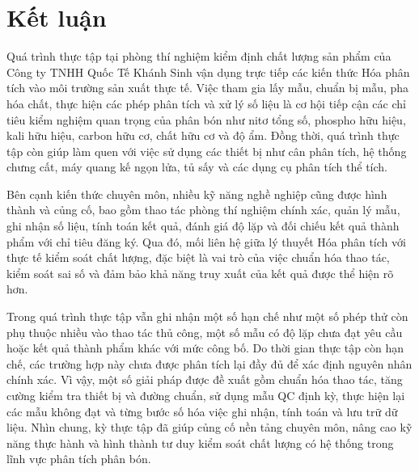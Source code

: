 \chapter{Kết luận}

Quá trình thực tập tại phòng thí nghiệm kiểm định chất lượng sản phẩm của Công ty TNHH Quốc Tế Khánh Sinh vận dụng trực tiếp các kiến thức Hóa phân tích vào môi trường sản xuất thực tế. Việc tham gia lấy mẫu, chuẩn bị mẫu, pha hóa chất, thực hiện các phép phân tích và xử lý số liệu là cơ hội tiếp cận các chỉ tiêu kiểm nghiệm quan trọng của phân bón như nitơ tổng số, phospho hữu hiệu, kali hữu hiệu, carbon hữu cơ, chất hữu cơ và độ ẩm. Đồng thời, quá trình thực tập còn giúp làm quen với việc sử dụng các thiết bị như cân phân tích, hệ thống chưng cất, máy quang kế ngọn lửa, tủ sấy và các dụng cụ phân tích thể tích.

Bên cạnh kiến thức chuyên môn, nhiều kỹ năng nghề nghiệp cũng được hình thành và củng cố, bao gồm thao tác phòng thí nghiệm chính xác, quản lý mẫu, ghi nhận số liệu, tính toán kết quả, đánh giá độ lặp và đối chiếu kết quả thành phẩm với chỉ tiêu đăng ký. Qua đó, mối liên hệ giữa lý thuyết Hóa phân tích với thực tế kiểm soát chất lượng, đặc biệt là vai trò của việc chuẩn hóa thao tác, kiểm soát sai số và đảm bảo khả năng truy xuất của kết quả được thể hiện rõ hơn.

Trong quá trình thực tập vẫn ghi nhận một số hạn chế như một số phép thử còn phụ thuộc nhiều vào thao tác thủ công, một số mẫu có độ lặp chưa đạt yêu cầu hoặc kết quả thành phẩm khác với mức công bố. Do thời gian thực tập còn hạn chế, các trường hợp này chưa được phân tích lại đầy đủ để xác định nguyên nhân chính xác. Vì vậy, một số giải pháp được đề xuất gồm chuẩn hóa thao tác, tăng cường kiểm tra thiết bị và đường chuẩn, sử dụng mẫu QC định kỳ, thực hiện lại các mẫu không đạt và từng bước số hóa việc ghi nhận, tính toán và lưu trữ dữ liệu. Nhìn chung, kỳ thực tập đã giúp củng cố nền tảng chuyên môn, nâng cao kỹ năng thực hành và hình thành tư duy kiểm soát chất lượng có hệ thống trong lĩnh vực phân tích phân bón.
